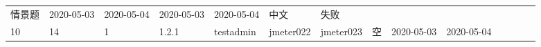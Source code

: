 \documentclass[hyperref, a4paper]{ctexart}
\begin{document}
\begin{longtable}[]{@{}llllllllllllll@{}}
\begin{minipage}[t]{0.02\columnwidth}
情景题\strut
\end{minipage} & \begin{minipage}[t]{0.04\columnwidth}\raggedright
2020-05-03\strut
\end{minipage} & \begin{minipage}[t]{0.05\columnwidth}\raggedright
2020-05-04\strut
\end{minipage} & \begin{minipage}[t]{0.07\columnwidth}\raggedright
2020-05-03\strut
\end{minipage} & \begin{minipage}[t]{0.08\columnwidth}\raggedright
2020-05-04\strut
\end{minipage} & \begin{minipage}[t]{0.04\columnwidth}\raggedright
中文\strut
\end{minipage} & \begin{minipage}[t]{0.02\columnwidth}\raggedright
失败\strut
\end{minipage}\tabularnewline
\begin{minipage}[t]{0.01\columnwidth}\raggedright
10\strut
\end{minipage} & \begin{minipage}[t]{0.12\columnwidth}\raggedright
14\strut
\end{minipage} & \begin{minipage}[t]{0.03\columnwidth}\raggedright
1\strut
\end{minipage} & \begin{minipage}[t]{0.06\columnwidth}\raggedright
1.2.1\strut
\end{minipage} & \begin{minipage}[t]{0.04\columnwidth}\raggedright
testadmin\strut
\end{minipage} & \begin{minipage}[t]{0.04\columnwidth}\raggedright
jmeter022\strut
\end{minipage} & \begin{minipage}[t]{0.04\columnwidth}\raggedright
jmeter023\strut
\end{minipage} & \begin{minipage}[t]{0.02\columnwidth}\raggedright
空\strut
\end{minipage} & \begin{minipage}[t]{0.04\columnwidth}\raggedright
2020-05-03\strut
\end{minipage} & \begin{minipage}[t]{0.05\columnwidth}\raggedright
2020-05-04\strut
\end{minipage} & \begin{minipage}[t]{0.07\columnwidth}\raggedright

\end{minipage}
\end{longtable}
\end{document}
